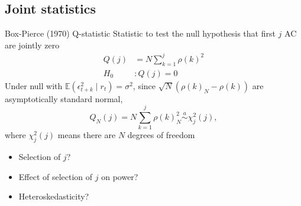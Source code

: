 \documentclass[xcolor=table, aspectratio=169]{beamer}
\begin{document}

\subsection{Joint statistics}

\begin{frame}{Box-Pierce (1970) Q-statistic}
Statistic to test the null hypothesis that first $j$ AC are jointly zero
\begin{align*}
Q(j) &= N \sum_{k=1}^j \rho(k)^2 \\
H_0 &: Q(j) = 0
\end{align*}
Under null with $\mathbb{E} \left( \epsilon_{t+k}^2 \mid r_t \right) = \sigma^2$, since $\sqrt{N}(\rho(k)_N - \rho(k))$ are asymptotically standard normal, 
$$Q_N(j) = N \sum_{k=1}^j \rho(k)_N^2 \overset{a}{\sim} \chi_j^2(j),$$
where $\chi_j^2(j)$ means there are $N$ degrees of freedom
\begin{itemize}
\item Selection of $j$?
\item Effect of selection of $j$ on power?
\item Heteroskedasticity?
\end{itemize}
\end{frame}
\end{document}
